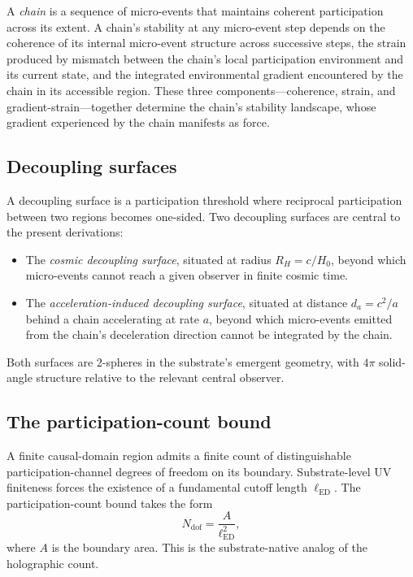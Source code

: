 \documentclass[11pt,a4paper]{article}
\begin{document}
A \emph{chain} is a sequence of micro-events that maintains coherent participation across its extent. A chain's stability at any micro-event step depends on the coherence of its internal micro-event structure across successive steps, the strain produced by mismatch between the chain's local participation environment and its current state, and the integrated environmental gradient encountered by the chain in its accessible region. These three components---coherence, strain, and gradient-strain---together determine the chain's stability landscape, whose gradient experienced by the chain manifests as force.

\subsection{Decoupling surfaces}

A decoupling surface is a participation threshold where reciprocal participation between two regions becomes one-sided. Two decoupling surfaces are central to the present derivations:

\begin{itemize}
\item The \emph{cosmic decoupling surface}, situated at radius $R_H = c/H_0$, beyond which micro-events cannot reach a given observer in finite cosmic time.
\item The \emph{acceleration-induced decoupling surface}, situated at distance $d_a = c^2/a$ behind a chain accelerating at rate $a$, beyond which micro-events emitted from the chain's deceleration direction cannot be integrated by the chain.
\end{itemize}

Both surfaces are 2-spheres in the substrate's emergent geometry, with $4\pi$ solid-angle structure relative to the relevant central observer.

\subsection{The participation-count bound}

A finite causal-domain region admits a finite count of distinguishable participation-channel degrees of freedom on its boundary. Substrate-level UV finiteness forces the existence of a fundamental cutoff length $\ell_{\mathrm{ED}}$. The participation-count bound takes the form
\begin{equation}
N_{\mathrm{dof}} = \frac{A}{\ell_{\mathrm{ED}}^2},
\end{equation}
where $A$ is the boundary area. This is the substrate-native analog of the holographic count.
\end{document}
